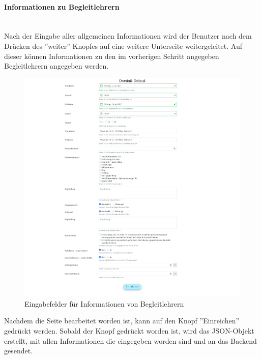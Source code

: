 \paragraph{Informationen zu Begleitlehrern}~\\
Nach der Eingabe aller allgemeinen Informationen wird der Benutzer nach dem Drücken des ''weiter'' Knopfes auf eine weitere Unterseite weitergeleitet. Auf dieser können Informationen zu den im vorherigen Schritt angegeben Begleitlehrern angegeben werden.
\begin{figure}[H]
	\centering
	\includegraphics[width=1\linewidth]{images/escorts}
	\caption[Schulveranstaltung 2]{Eingabefelder für Informationen von Begleitlehrern}
	\label{fig:escorts}
\end{figure}
\newpage
Nachdem die Seite bearbeitet worden ist, kann auf den Knopf ''Einreichen'' gedrückt werden. Sobald der Knopf gedrückt worden ist, wird das JSON-Objekt erstellt, mit allen Informationen die eingegeben worden sind und an das Backend gesendet.
\label{code_submit_data}
